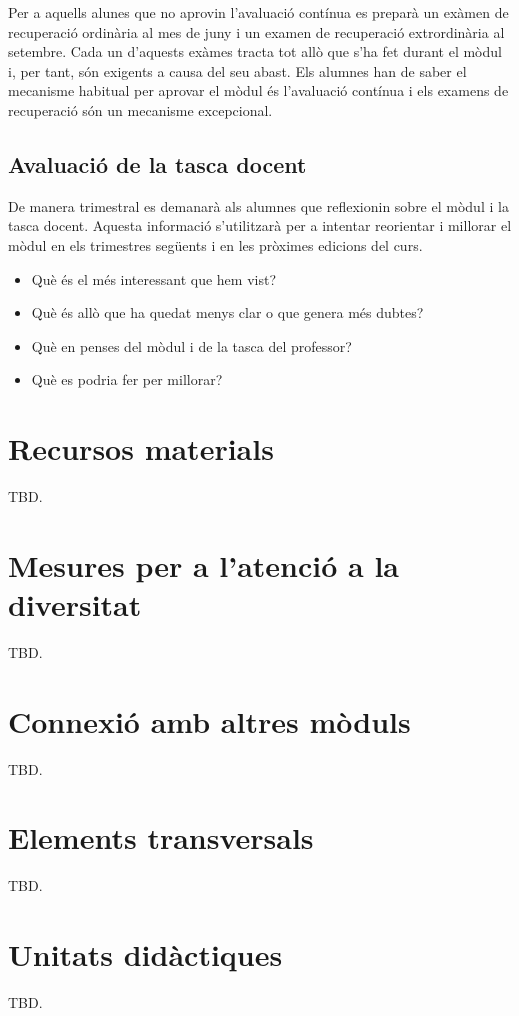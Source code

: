 \documentclass[catalan, a4paper, 12pt, titlepage]{article}
\begin{document}
Per a aquells alunes que no aprovin l'avaluació contínua es preparà un exàmen de recuperació ordinària al mes de juny i un examen de recuperació extrordinària al setembre. Cada un d'aquests exàmes tracta tot allò que s'ha fet durant el mòdul i, per tant, són exigents a causa del seu abast. Els alumnes han de saber el mecanisme habitual per aprovar el mòdul és l'avaluació contínua i els examens de recuperació són un mecanisme excepcional.

\subsection{Avaluació de la tasca docent}

De manera trimestral es demanarà als alumnes que reflexionin sobre el mòdul i la tasca docent. Aquesta informació s'utilitzarà per a intentar reorientar i millorar el mòdul en els trimestres següents i en les pròximes edicions del curs. 

\begin{itemize}
	\item Què és el més interessant que hem vist?
	\item Què és allò que ha quedat menys clar o que genera més dubtes?
	\item Què en penses del mòdul i de la tasca del professor?
	\item Què es podria fer per millorar?
\end{itemize}

\section{Recursos materials}
TBD.

\section{Mesures per a l'atenció a la diversitat}
TBD.

\section{Connexió amb altres mòduls}
TBD.

\section{Elements transversals}
TBD.

\section{Unitats didàctiques}
TBD.
\end{document}

